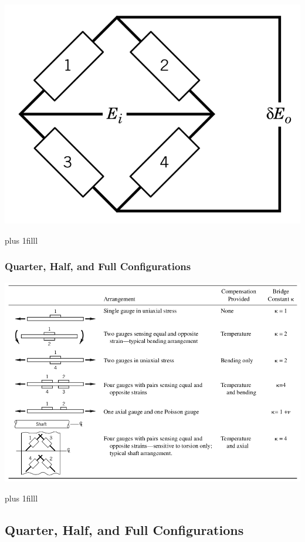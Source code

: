 \documentclass[fleqn]{beamer} %
\newcommand{\sectionIIIsubsectionIItitle}{Quarter, Half, and Full Configurations}
\newcommand{\btVFill}{\vskip0pt plus 1filll}
\begin{document}
\begin{frame}
				\includegraphics[scale=.16]{images/gauge_in_bridge_full.png}

				\btVFill

			\end{frame}

			\begin{frame}
				\frametitle{\sectionIIIsubsectionIItitle}

				\bigskip
				\includegraphics[scale=.3]{images/gauge_configurations.png}
			
				\btVFill

			\end{frame}

		\subsection{\sectionIIIsubsectionIItitle}\label{sectionIIIsubsectionIII}
\end{document}
